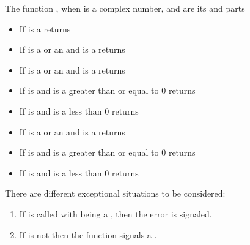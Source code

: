 \documentclass[../Comparisons-Predicates.tex]{subfiles}
\begin{document}
    \noindent
    The function , when  is a complex number, 
    and  are its  and  parts
    \begin{itemize}
        \item If  is a  returns 
        \code{))}
        \item If  is a  or an
         and
         is a
         returns 
        \item If  is a  or an
         and
         is a
         returns 
        \item If  is  and
         is a greater than or equal to $0$ returns 
        \item If  is  and
         is a less than $0$ returns 
        \item If  is a  or an
         and
         is a
         returns 
        \item If  is  and
         is a greater than or equal to $0$ returns 
        \item If  is  and
         is a less than $0$ returns 
    \end{itemize}


    \DExceptional{}

    There are different exceptional situations to be considered:
    \begin{enumerate}
        \item If  is called with
         being a , then the
         error is signaled.
        \item If  is not \CL{}
         then the function  signals a
        .
    \end{enumerate}
\end{document}
